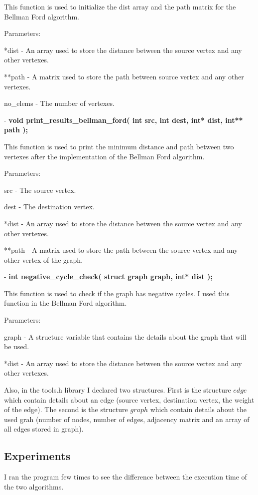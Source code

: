\documentclass[12]{article}
\begin{document}
This function is used to initialize the dist array and the path matrix for the Bellman Ford algorithm.

Parameters: 

		*dist - An array used to store the distance between the source vertex and any other vertexes.
		
		**path - A matrix used to store the path between source vertex and any other vertexes.
		
		no\_elems - The number of vertexes.

- \textbf{void print\_results\_bellman\_ford( int src, int dest, int* dist, int** path );}

This function is used to print the minimum distance and path between two vertexes after the implementation of the Bellman Ford algorithm.

Parameters:

src - The source vertex.

 dest - The destination vertex.
 
 *dist - An array used to store the distance between the source vertex and any other vertexes.
 
 **path - A matrix used to store the path between the source vertex and any other vertex of the graph.
		

- \textbf{int negative\_cycle\_check( struct graph graph, int* dist );}


This function is used to check if the graph has negative cycles. I used this function in the Bellman Ford algorithm.

Parameters: 

graph - A structure variable that contains the details about the graph that will be used.

*dist - An array used to store the distance between the source vertex and any other vertexes.		

Also, in the tools.h library I declared two structures. First is the structure $edge$ which contain details about an edge (source vertex, destination vertex, the weight of the edge). The second is the structure $graph$ which contain details about the used grah (number of nodes, number of edges, adjacency matrix and an array of all edges stored in graph).

\subsection{Experiments}
\textbf{}

I ran the program few times to see the difference between the execution time of the two algorithms.
\end{document}
